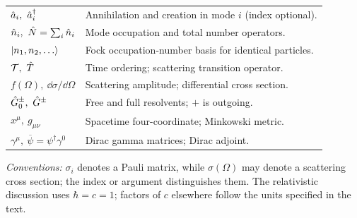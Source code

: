 \begin{tabular}{@{}>{\raggedright\arraybackslash}p{}>{\raggedright\arraybackslash}p{}@{}}
$\hat{a}_i,\ \hat{a}_i^\dagger$ & Annihilation and creation in mode $i$ (index optional).\\
$\hat{n}_i,\ \hat{N}=\sum_i\hat{n}_i$ & Mode occupation and total number operators.\\
$\left|n_1,n_2,\ldots\right\rangle$ & Fock occupation-number basis for identical particles.\\
$\timeorder,\ \op T$ & Time ordering; scattering transition operator.\\
$f(\Omega),\ \dd\sigma/\dd\Omega$ & Scattering amplitude; differential cross section.\\
$\op G_0^\pm,\ \op G^\pm$ & Free and full resolvents; $+$ is outgoing.\\
$x^\mu,\ g_{\mu\nu}$ & Spacetime four-coordinate; Minkowski metric.\\
$\gamma^\mu,\ \overline\psi=\psi^\dagger\gamma^0$ & Dirac gamma matrices; Dirac adjoint.\\
\bottomrule
\end{tabular}
\par\smallskip
\noindent\footnotesize
\emph{Conventions:} $\sigma_i$ denotes a Pauli matrix, while $\sigma(\Omega)$
may denote a scattering cross section; the index or argument distinguishes them.
The relativistic discussion uses $\hbar=c=1$; factors of $c$ elsewhere
follow the units specified in the text.
\endgroup